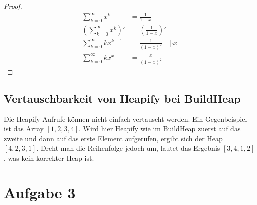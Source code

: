 \documentclass[a4paper]{article}
\begin{document}
    \begin{proof}
        \begin{align*}
            \sum_{k=0}^{\infty}{x^k} &= \frac{1}{1 - x} \\
            \left( \sum_{k=0}^{\infty}{x^k} \right)' &= \left( \frac{1}{1 - x} \right)' \\
            \sum_{k=0}^{\infty}{k x^{k-1}} &= \frac{1}{(1 - x)^2} \quad | \cdot x \\
            \sum_{k=0}^{\infty}{k x^x} &= \frac{x}{(1 - x)^2}
        \end{align*}
    \end{proof}

    \subsection*{Vertauschbarkeit von Heapify bei BuildHeap}
    Die Heapify-Aufrufe können nicht einfach vertauscht werden.
    Ein Gegenbeispiel ist das Array $[1, 2, 3, 4]$.
    Wird hier Heapify wie im BuildHeap zuerst auf das zweite und dann auf das erste Element aufgerufen, ergibt sich der Heap $[4, 2, 3, 1]$.
    Dreht man die Reihenfolge jedoch um, lautet das Ergebnis $[3, 4, 1, 2]$, was kein korrekter Heap ist.

    \section*{Aufgabe 3}
    \label{sec:aufgabe3}
\end{document}
